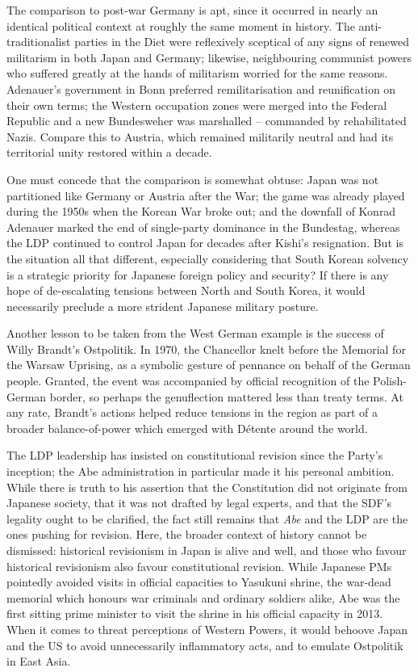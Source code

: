 \documentclass[letterpaper,12pt,twoside]{article} %
\begin{document}
\begin{multicols}{2}
The comparison to post-war Germany is apt, since it occurred in nearly an identical political context at roughly the same moment in history. The anti-traditionalist parties in the Diet were reflexively sceptical of any signs of renewed militarism in both Japan and Germany; likewise, neighbouring communist powers who suffered greatly at the hands of militarism worried for the same reasons. Adenauer's government in Bonn preferred remilitarisation and reunification on their own terms; the Western occupation zones were merged into the Federal Republic and a new Bundesweher was marshalled -- commanded by rehabilitated Nazis. Compare this to  Austria, which remained militarily neutral and had its territorial unity restored within a decade.

One must concede that the comparison is somewhat obtuse: Japan was not partitioned like Germany or Austria after the War; the game was already played during the 1950s when the Korean War broke out; and the downfall of Konrad Adenauer marked the end of single-party dominance in the Bundestag, whereas the LDP continued to control Japan for decades after Kishi's resignation. But is the situation all that different, especially considering that South Korean solvency is a strategic priority for Japanese foreign policy and security? If there is any hope of de-escalating tensions between North and South Korea, it would necessarily preclude a more strident Japanese military posture.

Another lesson to be taken from the West German example is the success of Willy Brandt's Ostpolitik. In 1970, the Chancellor knelt before the Memorial for the Warsaw Uprising, as a symbolic gesture of pennance on behalf of the German people. Granted, the event was accompanied by official recognition of the Polish-German border, so perhaps the genuflection mattered less than treaty terms. At any rate, Brandt's actions helped reduce tensions in the region as part of a broader balance-of-power which emerged with Détente around the world.

The LDP leadership has insisted on constitutional revision since the Party's inception; the Abe administration in particular made it his personal ambition. While there is truth to his assertion that the Constitution did not originate from Japanese society, that it was not drafted by legal experts, and that the SDF's legality ought to be clarified, the fact still remains that \textit{Abe} and the LDP are the ones pushing for revision. Here, the broader context of history cannot be dismissed: historical revisionism in Japan is alive and well, and those who favour historical revisionism also favour constitutional revision. While Japanese PMs pointedly avoided visits in official capacities to Yasukuni shrine, the war-dead memorial which honours war criminals and ordinary soldiers alike, Abe was the first sitting prime minister to visit the shrine in his official capacity in 2013. When it comes to threat perceptions of Western Powers, it would behoove Japan and the US to avoid unnecessarily inflammatory acts, and to emulate Ostpolitik in East Asia.


\end{multicols}
\end{document}
